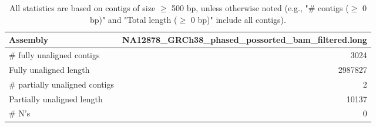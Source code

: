 \documentclass[12pt,a4paper]{article}
\begin{document}
\begin{table}[ht]
\begin{center}
\caption{All statistics are based on contigs of size $\geq$ 500 bp, unless otherwise noted (e.g., "\# contigs ($\geq$ 0 bp)" and "Total length ($\geq$ 0 bp)" include all contigs).}
\begin{tabular}{|l*{1}{|r}|}
\hline
Assembly & NA12878\_GRCh38\_phased\_possorted\_bam\_filtered.long \\ \hline
\# fully unaligned contigs & 3024 \\ \hline
Fully unaligned length & 2987827 \\ \hline
\# partially unaligned contigs & 2 \\ \hline
Partially unaligned length & 10137 \\ \hline
\# N's & 0 \\ \hline
\end{tabular}
\end{center}
\end{table}
\end{document}
